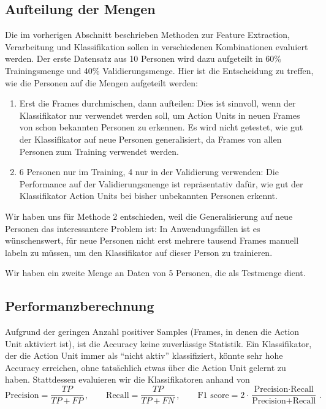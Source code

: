 \subsection{Aufteilung der Mengen}
Die im vorherigen Abschnitt beschrieben Methoden zur Feature Extraction,
Verarbeitung und Klassifikation sollen in verschiedenen Kombinationen evaluiert
werden. Der erste Datensatz aus 10 Personen wird dazu aufgeteilt in 60\%
Trainingsmenge und 40\% Validierungsmenge. Hier ist die Entscheidung zu treffen,
wie die Personen auf die Mengen aufgeteilt werden:
\begin{enumerate}
\item Erst die Frames durchmischen, dann aufteilen: Dies ist sinnvoll, wenn der
  Klassifikator nur verwendet werden soll, um Action Units in neuen Frames von schon bekannten
  Personen zu erkennen. Es wird nicht getestet, wie gut der Klassifikator auf
  neue Personen generalisiert, da Frames von allen Personen zum Training verwendet werden.
  \item 6 Personen nur im Training, 4 nur in der Validierung verwenden: Die
    Performance auf der Validierungsmenge ist repräsentativ dafür, wie gut der
    Klassifikator Action Units bei bisher unbekannten Personen erkennt.
\end{enumerate}
Wir haben uns für Methode 2 entschieden, weil
die Generalisierung auf neue Personen das interessantere Problem ist: In
Anwendungsfällen ist es wünschenswert, für neue Personen nicht erst mehrere
tausend Frames manuell labeln zu müssen, um den Klassifikator auf dieser Person
zu trainieren.

Wir haben ein zweite Menge an Daten von 5 Personen, die als Testmenge dient.
\subsection{Performanzberechnung}
Aufgrund der geringen Anzahl positiver Samples (Frames, in denen die Action Unit
aktiviert ist), ist die Accuracy keine zuverlässige Statistik. Ein Klassifikator,
der die Action Unit immer als "`nicht aktiv"' klassifiziert, könnte sehr hohe
Accuracy erreichen, ohne tatsächlich etwas über die Action Unit gelernt zu haben.
Stattdessen evaluieren wir die Klassifikatoren anhand von
\begin{equation*}
\text{Precision}=\frac{TP}{TP+FP}\,, \qquad \text{Recall}=\frac{TP}{TP+FN}\,, \qquad \text{F1 score}=2\cdot\frac{\text{Precision}\cdot\text{Recall}}{\text{Precision}+\text{Recall}}\,.
\end{equation*}

